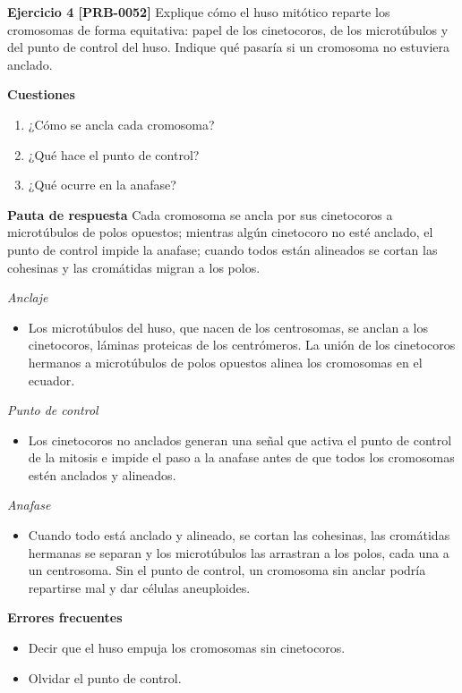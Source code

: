 \documentclass{book}
\begin{document}
\noindent\textbf{Ejercicio 4 [PRB-0052]}
Explique cómo el huso mitótico reparte los cromosomas de forma equitativa: papel de los cinetocoros, de los microtúbulos y del punto de control del huso. Indique qué pasaría si un cromosoma no estuviera anclado.


\noindent\textbf{Cuestiones}
\begin{enumerate}
\item ¿Cómo se ancla cada cromosoma?
\item ¿Qué hace el punto de control?
\item ¿Qué ocurre en la anafase?
\end{enumerate}

\noindent\textbf{Pauta de respuesta}
Cada cromosoma se ancla por sus cinetocoros a microtúbulos de polos opuestos; mientras algún cinetocoro no esté anclado, el punto de control impide la anafase; cuando todos están alineados se cortan las cohesinas y las cromátidas migran a los polos.


\noindent\textit{Anclaje}
\begin{itemize}
\item Los microtúbulos del huso, que nacen de los centrosomas, se anclan a los cinetocoros, láminas proteicas de los centrómeros. La unión de los cinetocoros hermanos a microtúbulos de polos opuestos alinea los cromosomas en el ecuador.
\end{itemize}

\noindent\textit{Punto de control}
\begin{itemize}
\item Los cinetocoros no anclados generan una señal que activa el punto de control de la mitosis e impide el paso a la anafase antes de que todos los cromosomas estén anclados y alineados.
\end{itemize}

\noindent\textit{Anafase}
\begin{itemize}
\item Cuando todo está anclado y alineado, se cortan las cohesinas, las cromátidas hermanas se separan y los microtúbulos las arrastran a los polos, cada una a un centrosoma. Sin el punto de control, un cromosoma sin anclar podría repartirse mal y dar células aneuploides.
\end{itemize}

\noindent\textbf{Errores frecuentes}
\begin{itemize}
\item Decir que el huso empuja los cromosomas sin cinetocoros.
\item Olvidar el punto de control.
\end{itemize}
\end{document}
